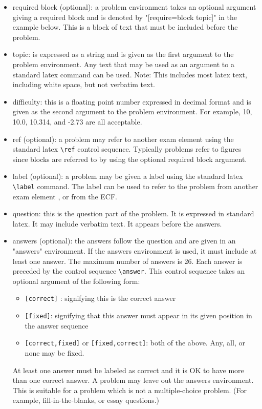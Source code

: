 \documentclass{article}
\begin{document}
\begin{itemize}
\item required block (optional): a problem environment takes an optional argument giving a required block and is denoted by "[require=block topic]" in the example below. This is a block of text that must be included before the problem.
\item topic: is expressed as a string and is given as the first argument to the problem environment. Any text that may be used as an argument to a standard latex command can be used. Note: This includes most latex text, including white space, but not verbatim text.
\item difficulty: this is a floating point number expressed in decimal format and is given as the second argument to the problem environment. For example, 10, 10.0, 10.314, and -2.73 are all acceptable.
\item ref (optional): a problem may refer to another exam element using the standard latex \verb|\ref| control sequence. Typically problems refer to figures since blocks are referred to by using the optional required block argument.
\item label (optional): a problem may be given a label using the standard latex \verb|\label| command. The label can be used to refer to the problem from another exam element , or from the ECF.
\item question: this is the question part of the problem. It is expressed in standard latex. It may include verbatim text. It appears before the answers.
\item answers (optional): the answers follow the question and are given in an "answers" environment. If the answers environment is used, it must include at least one answer. The maximum number of answers is 26. Each answer is preceded by the control sequence \verb|\answer|. This control sequence takes an optional argument of the following form:
\begin{itemize}
\item \verb|[correct]| : signifying this is the correct answer
\item \verb|[fixed]|: signifying that this answer must appear in its given position in the answer sequence
\item \verb|[correct,fixed]| or \verb|[fixed,correct]|: both of the above. Any, all, or none may be fixed.
\end{itemize}
At least one answer must be labeled as correct and it is OK to have more than one correct answer.
A problem may leave out the answers environment. This is suitable for a problem which is not a multiple-choice problem. (For example, fill-in-the-blanks, or essay questions.)
\end{itemize}
\end{document}

